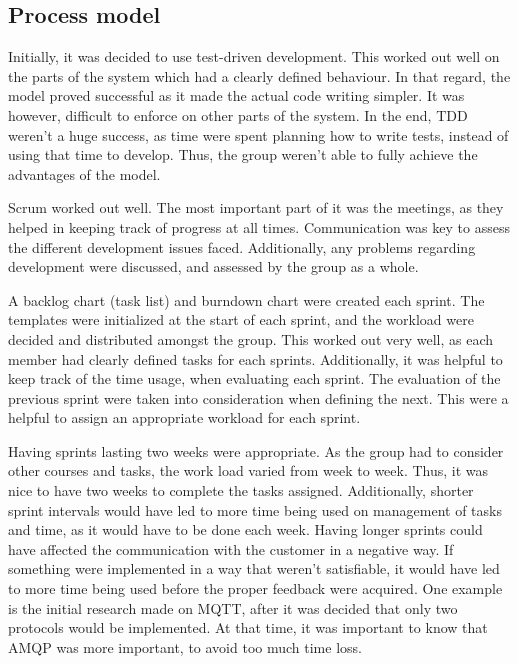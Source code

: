 \subsection{Process model}
\label{subsec:project_evaluation-development-process_model}

Initially, it was decided to use test-driven development. This worked out well on the parts of the system which had a clearly defined behaviour. In that regard, the model proved successful as it made the actual code writing simpler. It was however, difficult to enforce on other parts of the system. In the end, TDD weren't a huge success, as time were spent planning how to write tests, instead of using that time to develop. Thus, the group weren't able to fully achieve the advantages of the model. 

Scrum worked out well. The most important part of it was the meetings, as they helped in keeping track of progress at all times. Communication was key to assess the different development issues faced. Additionally, any problems regarding development were discussed, and assessed by the group as a whole. 

A backlog chart (task list) and burndown chart were created each sprint. The templates were initialized at the start of each sprint, and the workload were decided and distributed amongst the group. This worked out very well, as each member had clearly defined tasks for each sprints. Additionally, it was helpful to keep track of the time usage, when evaluating each sprint. The evaluation of the previous sprint were taken into consideration when defining the next. This were a helpful to assign an appropriate workload for each sprint.

Having sprints lasting two weeks were appropriate. As the group had to consider other courses and tasks, the work load varied from week to week. Thus, it was nice to have two weeks to complete the tasks assigned. Additionally, shorter sprint intervals would have led to more time being used on management of tasks and time, as it would have to be done each week. Having longer sprints could have affected the communication with the customer in a negative way. If something were implemented in a way that weren't satisfiable, it would have led to more time being used before the proper feedback were acquired. One example is the initial research made on MQTT, after it was decided that only two protocols would be implemented. At that time, it was important to know that AMQP was more important, to avoid too much time loss.


